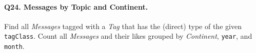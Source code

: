 \paragraph{\textbf{Q24}. Messages by Topic and Continent.}
Find all \emph{Messages} tagged with a \emph{Tag} that has the (direct)
type of the given \texttt{tagClass}.
Count all \emph{Messages} and their likes grouped by \emph{Continent},
\texttt{year}, and \texttt{month}.
